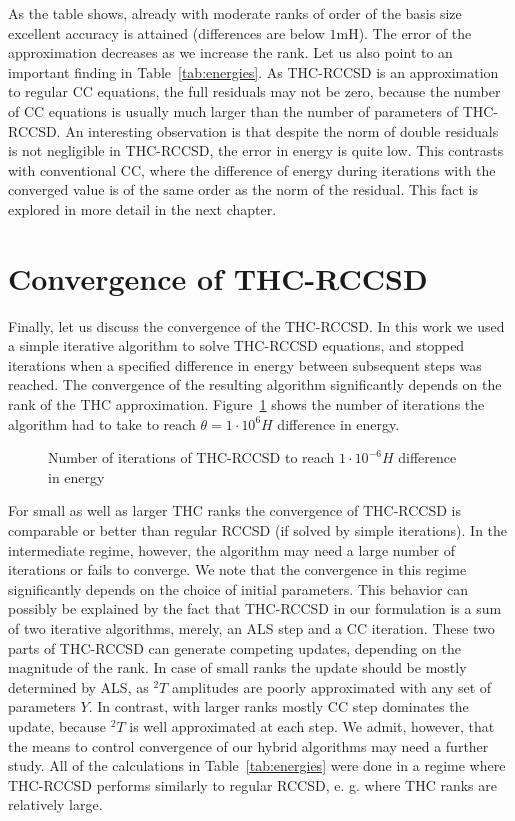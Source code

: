 %
As the table shows, already with moderate ranks of order of the basis size 
excellent accuracy is attained (differences are below $1 \mathrm{mH}$). The 
error of the approximation decreases as we increase the rank. Let us 
also point to an important finding in Table~\ref{tab:energies}. As THC-RCCSD is 
an approximation to regular CC equations, the full residuals may not be zero, 
because the number of CC equations is usually much larger than the number of 
parameters of THC-RCCSD. An interesting observation is that despite the norm of 
double residuals is not negligible in THC-RCCSD, the error in energy 
is quite low. This contrasts with conventional CC, where the 
difference of energy during iterations with the converged value  
is of the same order as the norm of the residual. This fact is explored in 
more detail in the next chapter. 

\section{Convergence of THC-RCCSD}
Finally, let us discuss the convergence of the THC-RCCSD. In this 
work we used a simple iterative algorithm to solve THC-RCCSD equations, 
and stopped iterations when a specified difference in energy between subsequent 
steps was reached. The convergence of the resulting algorithm significantly 
depends on the rank of the THC approximation. 
Figure~\ref{fig:cc_thc_convergence} shows the number of iterations the 
algorithm had to take to reach $\theta = 1\cdot 10^{6} H$ difference in energy.
%
\begin{figure}[tb]
\caption{Number of iterations of THC-RCCSD to reach $1 \cdot 10^{-6} H$ 
difference in energy}
\label{fig:cc_thc_convergence}
\end{figure}
%
For small as well as larger THC ranks the convergence of THC-RCCSD is 
comparable or better than regular RCCSD (if solved by simple iterations). 
In the intermediate regime, however, the algorithm may need
a large number of iterations or fails to converge. We note that the 
convergence in this regime significantly depends on the choice of initial 
parameters. This behavior can possibly be explained by the fact that THC-RCCSD 
in our formulation is a sum of two iterative algorithms, merely, an ALS step and 
a CC iteration. These two parts of THC-RCCSD can generate competing updates, 
depending on the magnitude of the rank. In case of small ranks the update 
should be mostly determined by ALS, as ${}^{2}T$ amplitudes are poorly 
approximated with any set of parameters $Y$. In contrast, with larger ranks 
mostly CC step dominates the update, because ${}^2T$ is well 
approximated at each step. We admit, however, that the means to control 
convergence of our hybrid algorithms may need a further study. All of the 
calculations in Table~\ref{tab:energies} were done in a regime where THC-RCCSD 
performs similarly to regular RCCSD, e. g. where THC ranks are relatively 
large. 


